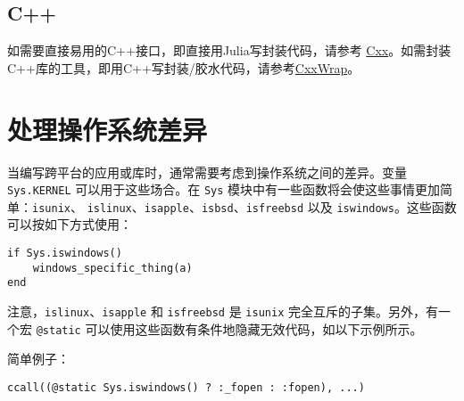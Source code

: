 \hypertarget{4039606750368114245}{}


\section{C++}



如需要直接易用的C++接口，即直接用Julia写封装代码，请参考 \href{https://github.com/Keno/Cxx.jl}{Cxx}。如需封装C++库的工具，即用C++写封装/胶水代码，请参考\href{https://github.com/JuliaInterop/CxxWrap.jl}{CxxWrap}。







\hypertarget{4348488381006315694}{}


\chapter{处理操作系统差异}



当编写跨平台的应用或库时，通常需要考虑到操作系统之间的差异。变量 \texttt{Sys.KERNEL} 可以用于这些场合。在 \texttt{Sys} 模块中有一些函数将会使这些事情更加简单：\texttt{isunix}、 \texttt{islinux}、\texttt{isapple}、\texttt{isbsd}、\texttt{isfreebsd} 以及 \texttt{iswindows}。这些函数可以按如下方式使用：




\begin{verbatim}
if Sys.iswindows()
    windows_specific_thing(a)
end
\end{verbatim}



注意，\texttt{islinux}、\texttt{isapple} 和 \texttt{isfreebsd} 是 \texttt{isunix} 完全互斥的子集。另外，有一个宏 \texttt{@static} 可以使用这些函数有条件地隐藏无效代码，如以下示例所示。



简单例子：




\begin{lstlisting}
ccall((@static Sys.iswindows() ? :_fopen : :fopen), ...)
\end{lstlisting}



